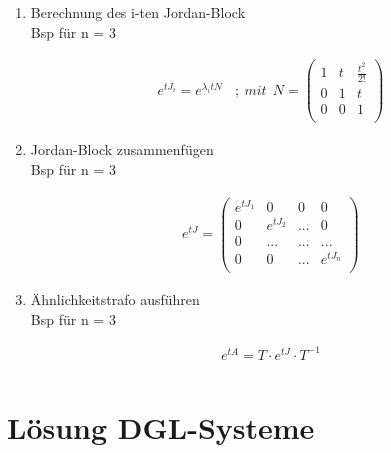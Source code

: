 \documentclass[10pt,a4paper]{article}
\begin{document}
\begin{enumerate}[(1)]
    \item Berechnung des i-ten Jordan-Block\\
        Bsp für n = 3
  \begin{mdframed}[style=exercise]
    \begin{align}
        e^{tJ_i} = e^{\lambda_i t N} \ \ \ \ ; \ mit \ \ 
        N = \begin{pmatrix}
            1 & t & \frac{t^2}{2!} \\
            0 & 1 &  t \\
            0 & 0 &  1 \\
        \end{pmatrix}
    \end{align}
  \end{mdframed}

    \item Jordan-Block zusammenfügen\\
        Bsp für n = 3
  \begin{mdframed}[style=exercise]
    \begin{align}
        e^{tJ} =
        \begin{pmatrix}
            e^{tJ_1} & 0 & 0 & 0 \\
            0 & e^{tJ_2} & ... & 0 \\
            0 &  ...  & ... &  ... \\
            0 & 0 & ... & e^{tJ_n} \\
        \end{pmatrix}
    \end{align}
  \end{mdframed}

    \item Ähnlichkeitstrafo ausführen\\
        Bsp für n = 3
  \begin{mdframed}[style=exercise]
    \begin{align}
        e^{tA} = T \cdot e^{tJ} \cdot T^{-1} \\
    \end{align}
  \end{mdframed}
\end{enumerate}


\section{Lösung DGL-Systeme}
\end{document}
